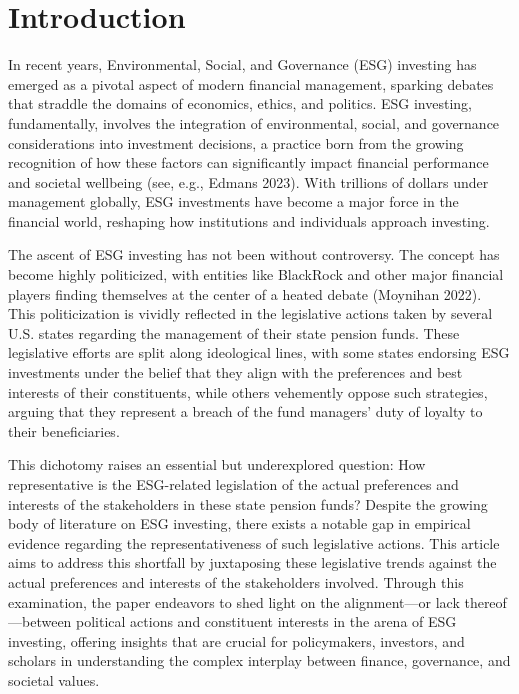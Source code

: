 \documentclass[
  12pt,
]{article}
\begin{document}
\hypertarget{introduction}{%
\section{Introduction}\label{introduction}}

In recent years, Environmental, Social, and Governance (ESG) investing has emerged as a pivotal aspect of modern financial management, sparking debates that straddle the domains of economics, ethics, and politics. ESG investing, fundamentally, involves the integration of environmental, social, and governance considerations into investment decisions, a practice born from the growing recognition of how these factors can significantly impact financial performance and societal wellbeing (see, e.g., Edmans 2023). With trillions of dollars under management globally, ESG investments have become a major force in the financial world, reshaping how institutions and individuals approach investing.

The ascent of ESG investing has not been without controversy. The concept has become highly politicized, with entities like BlackRock and other major financial players finding themselves at the center of a heated debate (Moynihan 2022). This politicization is vividly reflected in the legislative actions taken by several U.S. states regarding the management of their state pension funds. These legislative efforts are split along ideological lines, with some states endorsing ESG investments under the belief that they align with the preferences and best interests of their constituents, while others vehemently oppose such strategies, arguing that they represent a breach of the fund managers' duty of loyalty to their beneficiaries.

This dichotomy raises an essential but underexplored question: How representative is the ESG-related legislation of the actual preferences and interests of the stakeholders in these state pension funds? Despite the growing body of literature on ESG investing, there exists a notable gap in empirical evidence regarding the representativeness of such legislative actions. This article aims to address this shortfall by juxtaposing these legislative trends against the actual preferences and interests of the stakeholders involved. Through this examination, the paper endeavors to shed light on the alignment---or lack thereof---between political actions and constituent interests in the arena of ESG investing, offering insights that are crucial for policymakers, investors, and scholars in understanding the complex interplay between finance, governance, and societal values.
\end{document}
